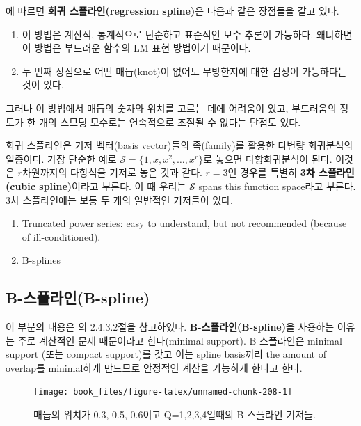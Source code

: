 \documentclass[b5paper,]{scrbook}
\theoremstyle{plain}
\theoremstyle{definition}
\numberwithin{equation}{section}
\begin{document}
\citep{Yee2015}에 따르면 \textbf{회귀 스플라인(regression spline)}은 다음과 같은 장점들을 같고 있다.

\begin{enumerate}
\def\labelenumi{\arabic{enumi}.}
\item
  이 방법은 계산적, 통계적으로 단순하고 표준적인 모수 추론이 가능하다. 왜냐하면 이 방법은 부드러운 함수의 LM 표현 방법이기 때문이다.
\item
  두 번째 장점으로 어떤 매듭(knot)이 없어도 무방한지에 대한 검정이 가능하다는 것이 있다.
\end{enumerate}

그러나 이 방법에서 매듭의 숫자와 위치를 고르는 데에 어려움이 있고, 부드러움의 정도가 한 개의 스므딩 모수로는 연속적으로 조절될 수 없다는 단점도 있다.

회귀 스플라인은 기저 벡터(basis vector)들의 족(family)를 활용한 다변량 회귀분석의 일종이다. 가장 단순한 예로 \(\mathcal{S}=\{1,x,x^{2},\ldots, x^{r}\}\)로 놓으면 다항회귀분석이 된다. 이것은 \(r\)차원까지의 다항식을 기저로 놓은 것과 같다. \(r=3\)인 경우를 특별히 \textbf{3차 스플라인(cubic spline)}이라고 부른다. 이 때 우리는 \(\mathcal{S}\) spans this function space라고 부른다. 3차 스플라인에는 보통 두 개의 일반적인 기저들이 있다.

\begin{enumerate}
\def\labelenumi{\arabic{enumi}.}
\item
  Truncated power series: easy to understand, but not recommended (because of ill-conditioned).
\item
  B-splines
\end{enumerate}

\hypertarget{b-b-spline}{%
\subsection{B-스플라인(B-spline)}\label{b-b-spline}}

이 부분의 내용은 \citep{Yee2015}의 2.4.3.2절을 참고하였다. \textbf{B-스플라인(B-spline)}을 사용하는 이유는 주로 계산적인 문제 때문이라고 한다(minimal support). B-스플라인은 minimal support (또는 compact support)를 갖고 이는 spline basis끼리 the amount of overlap를 minimal하게 만드므로 안정적인 계산을 가능하게 한다고 한다.

\begin{figure}

{\centering \texttt{[image: book\_files/figure-latex/unnamed-chunk-208-1]} 

}

\caption{매듭의 위치가 0.3, 0.5, 0.6이고 Q=1,2,3,4일때의 B-스플라인 기저들.}\label{fig:unnamed-chunk-208}
\end{figure}
\end{document}
